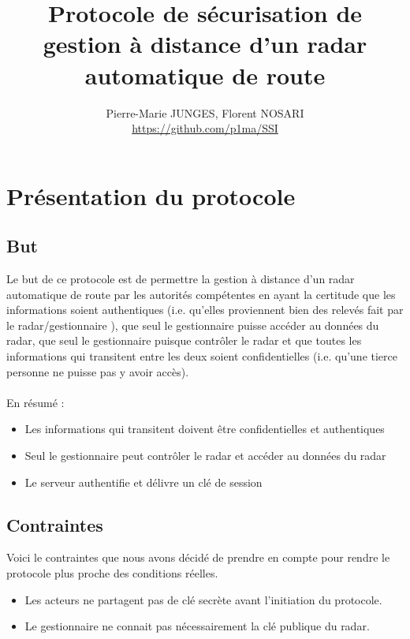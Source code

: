 \documentclass[]{scrartcl}
\title{Protocole de sécurisation de gestion à distance d'un radar automatique de route}
\author{Pierre-Marie JUNGES, Florent NOSARI \\ \url{https://github.com/p1ma/SSI}}
\begin{document}
\maketitle

\begin{abstract}

\end{abstract}

\section{Présentation du protocole}

\subsection{But}

Le but de ce protocole est de permettre la gestion à distance d'un radar automatique de route par les autorités compétentes en ayant la certitude que les informations soient authentiques (i.e. qu'elles proviennent bien des relevés fait par le radar/gestionnaire ), que seul le gestionnaire puisse accéder au données du radar, que seul le gestionnaire puisque contrôler le radar et que toutes les informations qui transitent entre les deux soient confidentielles (i.e. qu'une tierce personne ne puisse pas y avoir accès).
\\
\\
En résumé :
\\
\begin{itemize}
	\item Les informations qui transitent doivent être confidentielles et authentiques
	\item Seul le gestionnaire peut contrôler le radar et accéder au données du radar
	\item Le serveur authentifie et délivre un clé de session
\end{itemize}

\subsection{Contraintes}

Voici le contraintes que nous avons décidé de prendre en compte pour rendre le protocole plus proche des conditions réelles.
\begin{itemize}
	\item Les acteurs ne partagent pas de clé secrète avant l'initiation du protocole.
	\item Le gestionnaire ne connait pas nécessairement la clé publique du radar.
\end{itemize}
\end{document}
